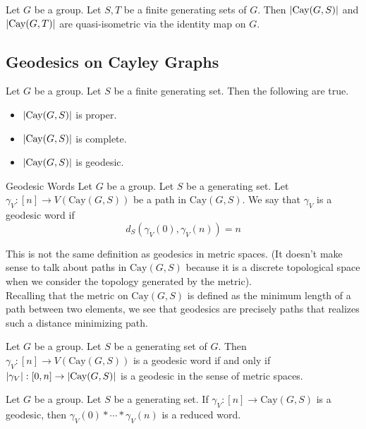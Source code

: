 \documentclass[a4paper]{article}
\begin{document}
\begin{prp}{}{} Let $G$ be a group. Let $S,T$ be a finite generating sets of $G$. Then $\abs{\text{Cay}(G,S)}$ and $\abs{\text{Cay}(G,T)}$ are quasi-isometric via the identity map on $G$. 
\end{prp}

\subsection{Geodesics on Cayley Graphs}
\begin{prp}{}{} Let $G$ be a group. Let $S$ be a finite generating set. Then the following are true. 
\begin{itemize}
\item $\abs{\text{Cay}(G,S)}$ is proper. 
\item $\abs{\text{Cay}(G,S)}$ is complete. 
\item $\abs{\text{Cay}(G,S)}$ is geodesic. 
\end{itemize}
\end{prp}

\begin{defn}{Geodesic Words}{} Let $G$ be a group. Let $S$ be a generating set. Let $\gamma_V:[n]\to V(\text{Cay}(G,S))$ be a path in $\text{Cay}(G,S)$. We say that $\gamma_V$ is a geodesic word if $$d_S(\gamma_V(0),\gamma_V(n))=n$$
\end{defn}

This is not the same definition as geodesics in metric spaces. (It doesn't make sense to talk about paths in $\text{Cay}(G,S)$ because it is a discrete topological space when we consider the topology generated by the metric). \\

Recalling that the metric on $\text{Cay}(G,S)$ is defined as the minimum length of a path between two elements, we see that geodesics are precisely paths that realizes such a distance minimizing path. 

\begin{prp}{}{} Let $G$ be a group. Let $S$ be a generating set of $G$. Then $\gamma_V:[n]\to V(\text{Cay}(G,S))$ is a geodesic word if and only if $\abs{\gamma_V}:[0,n]\to\abs{\text{Cay}(G,S)}$ is a geodesic in the sense of metric spaces. 
\end{prp}

\begin{lmm}{}{} Let $G$ be a group. Let $S$ be a generating set. If $\gamma_V:[n]\to\text{Cay}(G,S)$ is a geodesic, then $\gamma_V(0)\ast\cdots\ast\gamma_V(n)$ is a reduced word. 
\end{lmm}
\end{document}
